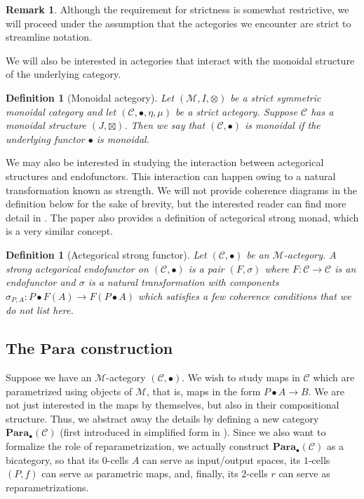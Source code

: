 \documentclass[11pt,a4paper,openright,twoside]{report}
\newcounter{mycounter}
\theoremstyle{plain}
\newtheorem{definition}[mycounter]{Definition}
\theoremstyle{definition}
\newtheorem{remark}[mycounter]{Remark}
\begin{document}
\begin{remark}
  Although the requirement for strictness is somewhat restrictive, we will proceed under the assumption that the actegories we encounter are strict to streamline notation.
\end{remark}

We will also be interested in actegories that interact with the monoidal structure of the underlying category.

\begin{definition}[Monoidal actegory]
  Let $(\mathcal{M},I,\otimes)$ be a strict symmetric monoidal category and let $(\mathcal{C}, \bullet, \eta, \mu)$ be a strict actegory. Suppose $\mathcal{C}$ has a monoidal structure $(J,\boxtimes)$. Then we say that $(\mathcal{C}, \bullet)$ is monoidal if the underlying functor $\bullet$ is monoidal.
\end{definition}


We may also be interested in studying the interaction between actegorical structures and endofunctors. This interaction can happen owing to a natural transformation known as strength. We will not provide coherence diagrams in the definition below for the sake of brevity, but the interested reader can find more detail in \cite{gavranovicposition}. The paper also provides a definition of actegorical strong monad, which is a very similar concept.


\begin{definition}[Actegorical strong functor]
  Let $(\mathcal{C}, \bullet)$ be an $\mathcal{M}$-actegory. A strong actegorical endofunctor on $(\mathcal{C}, \bullet)$ is a pair $(F, \sigma)$ where $F: \mathcal{C} \to \mathcal{C}$ is an endofunctor and $\sigma$ is a natural transformation with components $\sigma_{P,A}: P \bullet F(A) \to F(P \bullet A)$ which satisfies a few coherence conditions that we do not list here.
\end{definition}



\subsection{The $\mathbf{Para}$ construction}


Suppose we have an $\mathcal{M}$-actegory $(\mathcal{C}, \bullet)$. We wish to study maps in $\mathcal{C}$ which are parametrized using objects of $\mathcal{M}$, that is, maps in the form $P \bullet A \to B$. We are not just interested in the maps by themselves, but also in their compositional structure. Thus, we abstract away the details by defining a new category $\mathbf{Para}_{\bullet}(\mathcal{C})$ (first introduced in simplified form in \cite{fong2019backprop}). Since we also want to formalize the role of reparametrization, we actually construct $\mathbf{Para}_{\bullet}(\mathcal{C})$ as a bicategory, so that its $0$-cells $A$ can serve as input/output spaces, its $1$-cells $(P,f)$ can serve as parametric maps, and, finally, its $2$-cells $r$ can serve as reparametrizations.
\end{document}
